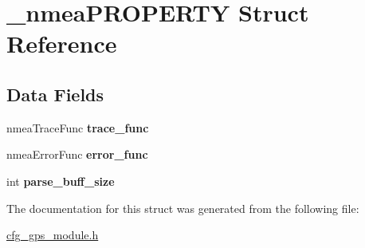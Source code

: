 \hypertarget{struct__nmea_p_r_o_p_e_r_t_y}{}\section{\+\_\+nmea\+P\+R\+O\+P\+E\+R\+TY Struct Reference}
\label{struct__nmea_p_r_o_p_e_r_t_y}
\subsection*{Data Fields}
\begin{DoxyCompactItemize}
\item 
\mbox{\label{struct__nmea_p_r_o_p_e_r_t_y_a47cd81014e14aea11e796a03e206756f}} 
nmea\+Trace\+Func {\bfseries trace\+\_\+func}
\item 
\mbox{\label{struct__nmea_p_r_o_p_e_r_t_y_a0e1eea97caddd2ff459545f8d0dc585e}} 
nmea\+Error\+Func {\bfseries error\+\_\+func}
\item 
\mbox{\label{struct__nmea_p_r_o_p_e_r_t_y_ae4204fbfa66337b765b3976d648ed9c6}} 
int {\bfseries parse\+\_\+buff\+\_\+size}
\end{DoxyCompactItemize}


The documentation for this struct was generated from the following file\+:\begin{DoxyCompactItemize}
\item 
\hyperlink{cfg__gps__module_8h}{cfg\+\_\+gps\+\_\+module.\+h}\end{DoxyCompactItemize}
